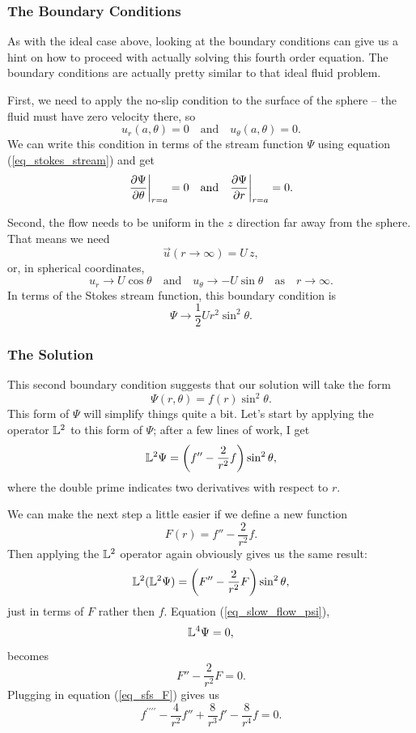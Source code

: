 \subsubsection{The Boundary Conditions}

As with the ideal case above, looking at the boundary conditions can give us a hint on how to proceed with actually solving this fourth order equation.  The boundary conditions are actually pretty similar to that ideal fluid problem.

First, we need to apply the no-slip condition to the surface of the sphere -- the fluid must have zero velocity there, so
\[
u_r(a, \theta) = 0 \quad \text{and} \quad u_\theta(a, \theta) = 0.
\]
We can write this condition in terms of the stream function $\Psi$ using equation (\ref{eq_stokes_stream}) and get
\begin{equation}
\label{eq_slow_bc1}
\frac{\partial {\Psi}}{\partial {\theta}} \bigg|_{r=a} = 0 \quad \text{and} \quad \frac{\partial {\Psi}}{\partial {r}} \bigg|_{r=a} = 0.
\end{equation}

Second, the flow needs to be uniform in the $z$ direction far away from the sphere.  That means we need
\[
\vec{u}(r \to \infty) = U \, \unit{z},
\]
or, in spherical coordinates,
\[
u_r \to U\cos\theta \quad \text{and} \quad u_\theta \to  - U \sin\theta \quad \text{as} \quad r \to \infty.
\]
In terms of the Stokes stream function, this boundary condition is
\begin{equation}
\label{eq_slow_bc2}
\Psi \to \frac{1}{2} U r^2 \sin^2 \theta.
\end{equation}

\subsubsection{The Solution}

This second boundary condition suggests that our solution will take the form
\begin{equation}
\Psi(r, \theta) = f(r) \sin^2\theta.
\end{equation}
This form of $\Psi$ will simplify things quite a bit.  Let's start by applying the operator $\mathbb{L}^2$ to this form of $\Psi$; after a few lines of work, I get
\[
\mathbb{L}^2 \Psi = \left( f'' - \frac{2}{r^2} f \right) \sin^2\theta,
\]
where the double prime indicates two derivatives with respect to $r$.

We can make the next step a little easier if we define a new function 
\begin{equation}
\label{eq_sfs_F}
F(r) = f'' - \frac{2}{r^2} f.
\end{equation}
Then applying the $\mathbb{L}^2$ operator again obviously gives us the same result:
\[
\mathbb{L}^2 (\mathbb{L}^2 \Psi) =  \left( F'' - \frac{2}{r^2} F \right) \sin^2\theta,
\]
just in terms of $F$ rather then $f$.  Equation (\ref{eq_slow_flow_psi}),
\[
\mathbb{L}^4 \Psi = 0,
\]
becomes 
\[
F'' - \frac{2}{r^2} F = 0.
\]
Plugging in equation (\ref{eq_sfs_F}) gives us 
\begin{equation}
f^{\prime\prime\prime\prime} - \frac{4}{r^2} f'' + \frac{8}{r^3} f' - \frac{8}{r^4} f = 0.
\end{equation}

